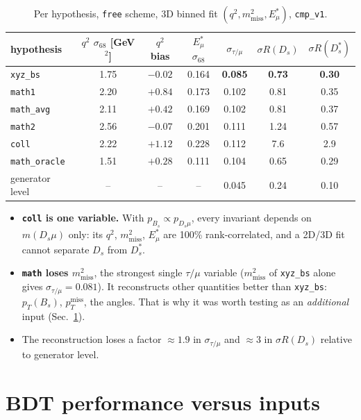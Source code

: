 \documentclass[10pt,a4paper]{article}
\newcommand{\code}[1]{\texttt{#1}}
\newcommand{\Ds}{D_s}
\newcommand{\Dss}{D_s^*}
\newcommand{\mm}{m^2_\text{miss}}
\newcommand{\Es}{E^*_\mu}
\newcommand{\sR}{\sigma R}
\begin{document}
\begin{table}[H]
\centering\small
\caption{Per hypothesis, \code{free} scheme, 3D binned fit $(q^2,\mm,\Es)$, \code{cmp\_v1}.}
\begin{tabular}{lcccccc}
\toprule
hypothesis & $q^2$ $\sigma_{68}$ [GeV$^2$] & $q^2$ bias & $\Es$ $\sigma_{68}$ & $\sigma_{\tau/\mu}$ & $\sR(\Ds)$ & $\sR(\Dss)$ \\
\midrule
\code{xyz\_bs}  & 1.75 & $-0.02$ & 0.164 & \textbf{0.085} & \textbf{0.73} & \textbf{0.30} \\
\code{math1}    & 2.20 & $+0.84$ & 0.173 & 0.102 & 0.81 & 0.35 \\
\code{math\_avg} & 2.11 & $+0.42$ & 0.169 & 0.102 & 0.81 & 0.37 \\
\code{math2}    & 2.56 & $-0.07$ & 0.201 & 0.111 & 1.24 & 0.57 \\
\code{coll}     & 2.22 & $+1.12$ & 0.228 & 0.112 & 7.6 & 2.9 \\
\midrule
\code{math\_oracle} & 1.51 & $+0.28$ & 0.111 & 0.104 & 0.65 & 0.29 \\
generator level & -- & -- & -- & 0.045 & 0.24 & 0.10 \\
\bottomrule
\end{tabular}
\end{table}

\begin{itemize}
\item \textbf{\code{coll} is one variable.} With $p_{B_s}\propto p_{\Ds\mu}$, every invariant depends on $m(\Ds\mu)$
  only: its $q^2$, $\mm$, $\Es$ are 100\% rank-correlated, and a 2D/3D fit cannot separate $\Ds$ from $\Dss$.
\item \textbf{\code{math} loses $\mm$}, the strongest single $\tau/\mu$ variable ($\mm$ of \code{xyz\_bs} alone gives
  $\sigma_{\tau/\mu}=0.081$). It reconstructs other quantities better than \code{xyz\_bs}: $p_T(B_s)$, $p_T^\text{miss}$,
  the angles. That is why it was worth testing as an \emph{additional} input (Sec.~\ref{sec:bdt}).
\item The reconstruction loses a factor $\approx1.9$ in $\sigma_{\tau/\mu}$ and $\approx3$ in $\sR(\Ds)$ relative to
  generator level.
\end{itemize}

\section{BDT performance versus inputs}
\label{sec:bdt}
\end{document}
